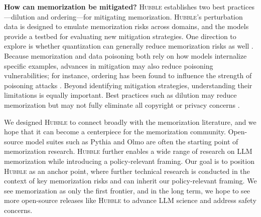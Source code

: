 \documentclass{article} %
\begin{document}
\textbf{How can memorization be mitigated?} \textsc{Hubble} establishes two best practices---dilution and ordering---for mitigating memorization. \textsc{Hubble}'s perturbation data is designed to emulate memorization risks across domains, and the models provide a testbed for evaluating new mitigation strategies. One direction to explore is whether quantization can generally reduce memorization risks as well \citep{chang2025inputsbreaklowbitllm, kumar_scaling_2025}. Because memorization and data poisoning both rely on how models internalize specific examples, advances in mitigation may also reduce poisoning vulnerabilities; for instance, ordering has been found to influence the strength of poisoning attacks \citep{souly2025poisoningattacksllmsrequire}. Beyond identifying mitigation strategies, understanding their limitations is equally important. Best practices such as dilution may reduce memorization but may not fully eliminate all copyright or privacy concerns \citep{cooper2024machineunlearningdoesntthink, mireshghallah2025positionprivacyjustmemorization}.

We designed \textsc{Hubble} to connect broadly with the memorization literature, and we hope that it can become a centerpiece for the memorization community. Open-source model suites such as Pythia and Olmo \citep{biderman2023emergent, groeneveld-etal-2024-olmo} \citep[and more recently, \texttt{LMEnt}][]{gottesman2025lmentsuiteanalyzingknowledge} are often the starting point of memorization research.  \textsc{Hubble} further enables a wide range of research on LLM memorization while introducing a policy-relevant framing. Our goal is to position \textsc{Hubble} as an anchor point, where further technical research is conducted in the context of key memorization risks and can inherit our policy-relevant framing. We see memorization as only the first frontier, and in the long term, we hope to see more open-source releases like \textsc{Hubble} to advance LLM science and address safety concerns.
\end{document}
